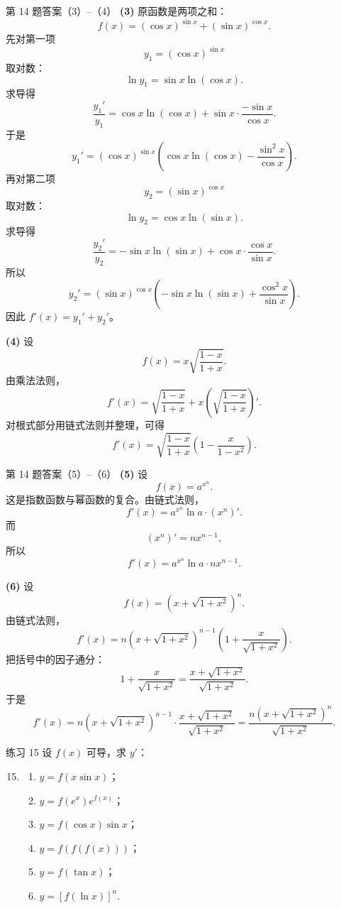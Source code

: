 ﻿\documentclass[aspectratio=169,11pt]{ctexbeamer}
\begin{document}
\begin{frame}[allowframebreaks]{第 14 题答案（3）--（4）}
\scriptsize
\textbf{(3)} 原函数是两项之和：
\[
f(x)=(\cos x)^{\sin x}+(\sin x)^{\cos x}.
\]
先对第一项
\[
y_1=(\cos x)^{\sin x}
\]
取对数：
\[
\ln y_1=\sin x\ln(\cos x).
\]
求导得
\[
\frac{y_1'}{y_1}=\cos x\ln(\cos x)+\sin x\cdot\frac{-\sin x}{\cos x}.
\]
于是
\[
y_1'=(\cos x)^{\sin x}\left(\cos x\ln(\cos x)-\frac{\sin^2x}{\cos x}\right).
\]
再对第二项
\[
y_2=(\sin x)^{\cos x}
\]
取对数：
\[
\ln y_2=\cos x\ln(\sin x).
\]
求导得
\[
\frac{y_2'}{y_2}=-\sin x\ln(\sin x)+\cos x\cdot\frac{\cos x}{\sin x}.
\]
所以
\[
y_2'=(\sin x)^{\cos x}\left(-\sin x\ln(\sin x)+\frac{\cos^2x}{\sin x}\right).
\]
因此 $f'(x)=y_1'+y_2'$。

\textbf{(4)} 设
\[
f(x)=x\sqrt{\frac{1-x}{1+x}}.
\]
由乘法法则，
\[
f'(x)=\sqrt{\frac{1-x}{1+x}}+x\left(\sqrt{\frac{1-x}{1+x}}\right)'.
\]
对根式部分用链式法则并整理，可得
\[
f'(x)=\sqrt{\frac{1-x}{1+x}}\left(1-\frac{x}{1-x^2}\right).
\]
\end{frame}

\begin{frame}[allowframebreaks]{第 14 题答案（5）--（6）}
\scriptsize
\textbf{(5)} 设
\[
f(x)=a^{x^n}.
\]
这是指数函数与幂函数的复合。由链式法则，
\[
f'(x)=a^{x^n}\ln a\cdot (x^n)'.
\]
而
\[
(x^n)'=nx^{n-1},
\]
所以
\[
f'(x)=a^{x^n}\ln a\cdot nx^{n-1}.
\]

\textbf{(6)} 设
\[
f(x)=(x+\sqrt{1+x^2})^n.
\]
由链式法则，
\[
f'(x)=n(x+\sqrt{1+x^2})^{n-1}\left(1+\frac{x}{\sqrt{1+x^2}}\right).
\]
把括号中的因子通分：
\[
1+\frac{x}{\sqrt{1+x^2}}
=\frac{x+\sqrt{1+x^2}}{\sqrt{1+x^2}}.
\]
于是
\[
f'(x)=n(x+\sqrt{1+x^2})^{n-1}
\cdot\frac{x+\sqrt{1+x^2}}{\sqrt{1+x^2}}
=\frac{n(x+\sqrt{1+x^2})^n}{\sqrt{1+x^2}}.
\]
\end{frame}

\begin{frame}{练习 15}
\scriptsize
设 $f(x)$ 可导，求 $y'$：
\begin{enumerate}
\setcounter{enumi}{14}
\item
\begin{enumerate}
\item $y=f(x\sin x)$；
\item $y=f(e^x)e^{f(x)}$；
\item $y=f(\cos x)\sin x$；
\item $y=f(f(f(x)))$；
\item $y=f(\tan x)$；
\item $y=[f(\ln x)]^n$.
\end{enumerate}
\end{enumerate}
\end{frame}
\end{document}
